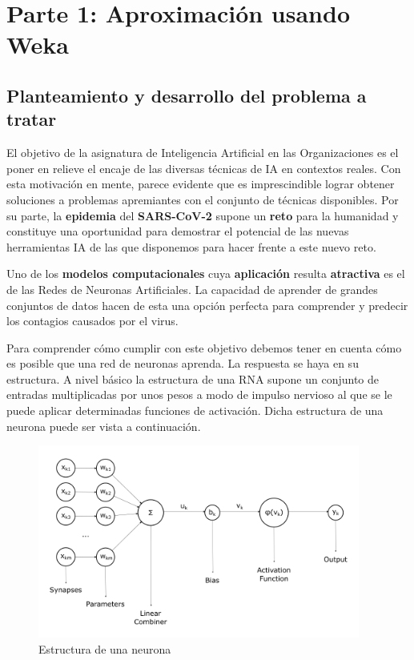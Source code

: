 \documentclass[12pt,a4paper, xcolor=table]{article}
\begin{document}
\section{Parte 1: Aproximación usando Weka}

    \subsection{Planteamiento y desarrollo del problema a tratar}
    
    El objetivo de la asignatura de Inteligencia Artificial en las Organizaciones es el poner en relieve el encaje de las diversas técnicas de IA en contextos reales. Con esta motivación en mente, parece evidente que es imprescindible lograr obtener soluciones a problemas apremiantes con el conjunto de técnicas disponibles. Por su parte, la \textbf{epidemia} del\textbf{ SARS-CoV-2 }supone un \textbf{reto} para la humanidad y constituye una oportunidad para demostrar el potencial de las nuevas herramientas IA de las que disponemos para hacer frente a este nuevo reto.

    \vspace{2mm}
    
    Uno de los \textbf{modelos computacionales} cuya \textbf{aplicación} resulta \textbf{atractiva} es el de las Redes de Neuronas Artificiales. La capacidad de aprender de grandes conjuntos de datos hacen de esta una opción perfecta para comprender y predecir los contagios causados por el virus. 
    
    Para comprender cómo cumplir con este objetivo debemos tener en cuenta cómo es posible que una red de neuronas aprenda. La respuesta se haya en su estructura. A nivel básico la estructura de una RNA supone un conjunto de entradas multiplicadas por unos pesos a modo de impulso nervioso al que se le puede aplicar determinadas funciones de activación. Dicha estructura de una neurona puede ser vista a continuación.    
   
    \begin{figure}[h]
        \centering
        \includegraphics[width=400px]{img/Neuron.png}
        \caption{Estructura de una neurona}
        \label{fig:graf_exp1}
    \end{figure}
\end{document}
